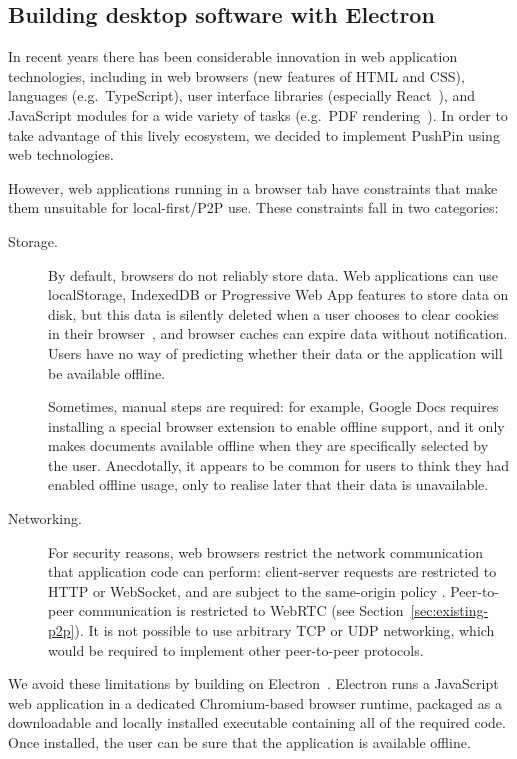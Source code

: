 \documentclass[sigplan,10pt]{acmart}
\begin{document}
\subsection{Building desktop software with Electron}

In recent years there has been considerable innovation in web application technologies, including in web browsers (new features of HTML and CSS), languages (e.g.\ TypeScript), user interface libraries (especially React~\cite{React}), and JavaScript modules for a wide variety of tasks (e.g.\ PDF rendering~\cite{PDFjs}).
In order to take advantage of this lively ecosystem, we decided to implement PushPin using web technologies.

However, web applications running in a browser tab have constraints that make them unsuitable for local-first/P2P use. These constraints fall in two categories:
\begin{description}
\item[Storage.]
By default, browsers do not reliably store data.
Web applications can use localStorage, IndexedDB or Progressive Web App features to store data on disk, but this data is silently deleted when a user chooses to clear cookies in their browser~\cite{LocalStorageCleared}, and browser caches can expire data without notification.
Users have no way of predicting whether their data or the application will be available offline.

Sometimes, manual steps are required: for example, Google Docs requires installing a special browser extension to enable offline support, and it only makes documents available offline when they are specifically selected by the user. Anecdotally, it appears to be common for users to think they had enabled offline usage, only to realise later that their data is unavailable.

\item[Networking.]
For security reasons, web browsers restrict the network communication that application code can perform: client-server requests are restricted to HTTP or WebSocket, and are subject to the same-origin policy \cite{SameOrigin}. Peer-to-peer communication is restricted to WebRTC (see Section~\ref{sec:existing-p2p}).
It is not possible to use arbitrary TCP or UDP networking, which would be required to implement other peer-to-peer protocols.
\end{description}

We avoid these limitations by building on Electron~\cite{Electron}.
Electron runs a JavaScript web application in a dedicated Chromium-based browser runtime, packaged as a downloadable and locally installed executable containing all of the required code.
Once installed, the user can be sure that the application is available offline.
\end{document}
